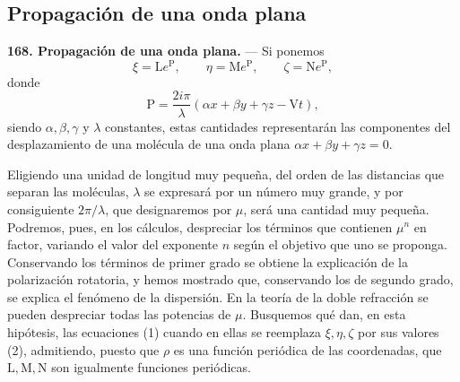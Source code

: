 \subsection{Propagación de una onda plana}

\noindent\textbf{168. Propagación de una onda plana.} — Si ponemos
\begin{equation}
\xi=\mathrm Le^{\mathrm P},\qquad \eta=\mathrm Me^{\mathrm P},\qquad \zeta=\mathrm Ne^{\mathrm P},
\tag{2}
\end{equation}
donde
\[
\mathrm P=\frac{2i\pi}{\lambda}(\alpha x+\beta y+\gamma z-\mathrm Vt),
\]
siendo $\alpha,\beta,\gamma$ y $\lambda$ constantes, estas cantidades
representarán las componentes del desplazamiento de una molécula de una
onda plana $\alpha x+\beta y+\gamma z=0$.

Eligiendo una unidad de longitud muy pequeña, del orden de las distancias
que separan las moléculas, $\lambda$ se expresará por un número muy
grande, y por consiguiente $2\pi/\lambda$, que designaremos por $\mu$,
será una cantidad muy pequeña. Podremos, pues, en los cálculos,
despreciar los términos que contienen $\mu^n$ en factor, variando el valor
del exponente $n$ según el objetivo que uno se proponga. Conservando los
términos de primer grado se obtiene la explicación de la polarización
rotatoria, y hemos mostrado que, conservando los de segundo grado, se
explica el fenómeno de la dispersión. En la teoría de la doble refracción
se pueden despreciar todas las potencias de $\mu$. Busquemos qué dan, en
esta hipótesis, las ecuaciones (1) cuando en ellas se reemplaza
$\xi,\eta,\zeta$ por sus valores (2), admitiendo, puesto que $\rho$ es una
función periódica de las coordenadas, que $\mathrm L,\mathrm M,\mathrm N$
son igualmente funciones periódicas.

